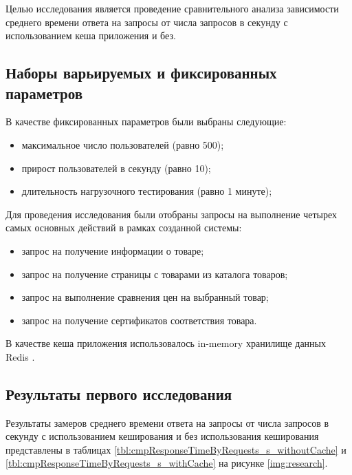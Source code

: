 Целью исследования является проведение сравнительного анализа зависимости среднего времени ответа на запросы от числа запросов в секунду с использованием кеша приложения и без.

\clearpage

\subsection{Наборы варьируемых и фиксированных параметров}


В качестве фиксированных параметров были выбраны следующие:

\begin{itemize}[label=--]
	\item максимальное число пользователей (равно 500);
	\item прирост пользователей в секунду (равно 10);
	\item длительность нагрузочного тестирования (равно 1 минуте);
\end{itemize}

Для проведения исследования были отобраны запросы на выполнение четырех самых основных действий в рамках созданной системы: 

\begin{itemize} 
	\item запрос на получение информации о товаре;
	\item запрос на получение страницы с товарами из каталога товаров;
	\item запрос на выполнение сравнения цен на выбранный товар;
	\item запрос на получение сертификатов соответствия товара.
\end{itemize}

В качестве кеша приложения использовалось in-memory хранилище данных Redis \cite{info_redis}.

\subsection{Результаты первого исследования}
Результаты замеров среднего времени ответа на запросы от числа запросов в секунду с использованием кеширования и без использования кеширования представлены в таблицах  \ref{tbl:cmpResponseTimeByRequests_s_withoutCache} и \ref{tbl:cmpResponseTimeByRequests_s_withCache} на рисунке \ref{img:research}.

